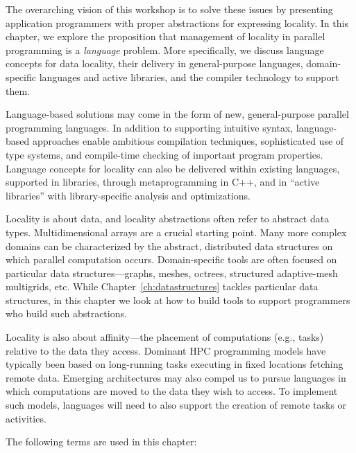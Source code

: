 The overarching vision of this workshop is to solve these issues by presenting application programmers with proper abstractions for expressing locality. In this chapter, we explore the proposition that management of locality in parallel programming is a \emph{language} problem. More specifically, we discuss language concepts for data locality, their delivery in general-purpose languages, domain-specific languages and active libraries, and the compiler technology to support them. 
 
Language-based solutions may come in the form of new, general-purpose parallel
programming languages.  In addition to supporting intuitive syntax, language-based approaches enable ambitious compilation techniques, sophisticated use of type systems, and compile-time checking of important program properties. Language concepts for locality can also be delivered within existing languages, supported in libraries, through metaprogramming in C++, and in ``active libraries'' with library-specific analysis and optimizations.
 

Locality is about data, and locality abstractions often refer to abstract data types. Multidimensional arrays are a crucial starting point.  Many more complex domains can be characterized by the abstract, distributed data structures on which parallel computation occurs. Domain-specific tools are often focused on particular data structures---graphs, meshes, octrees, structured adaptive-mesh multigrids, etc.  While Chapter~\ref{ch:datastructures} tackles particular data structures, in this chapter we look at how to build tools to support programmers who build such abstractions.

Locality is also about affinity---the placement of computations (e.g.,
tasks) relative to the data they access.  Dominant HPC programming
models have typically been based on long-running tasks executing in
fixed locations fetching remote data.  Emerging architectures may also
compel us to pursue languages in which computations are moved to the
data they wish to access.  To implement such models, languages will
need to also support the creation of remote tasks or activities.

The following terms are used in this chapter:

